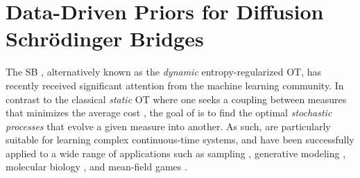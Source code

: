 \section{Data-Driven Priors for Diffusion Schr\"odinger Bridges} \label{sec:gsbflow}

The \acrlong{SB} \citep{leonard2013survey, chen2021stochastic}, alternatively known as the \emph{dynamic} entropy-regularized \acrlong{OT}, has recently received significant attention from the machine learning community. In contrast to the classical \emph{static} \acrshort{OT} where one seeks a {coupling} between measures that minimizes the average cost \citep{villani2009optimal,peyre2019computational}, the goal of  is to find the optimal \emph{stochastic processes} that evolve a given measure into another. As such,  are particularly suitable for learning complex continuous-time systems, and have been successfully applied to a wide range of applications such as sampling \citep{bernton2019schr, huang2021schrodinger}, generative modeling \citep{chen2021likelihood,de2021diffusion,wang2021deep}, molecular biology \citep{holdijk2022path}, and mean-field games \citep{liu2022deep}. 




